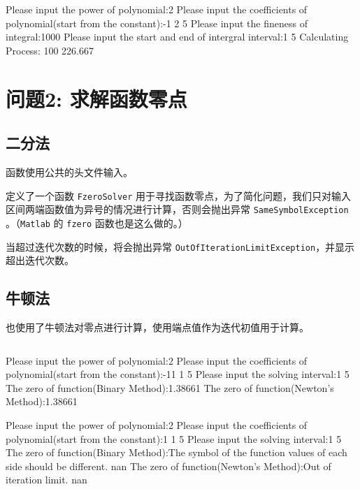\documentclass[12pt,a4paper]{article}
\begin{document}


\begin{literal}
Please input the power of polynomial:2
Please input the coefficients of polynomial(start from the constant):-1 2 5
Please input the fineness of integral:1000
Please input the start and end of intergral interval:1 5
Calculating Process: 100%
226.667
\end{literal}

\section{问题2: 求解函数零点}

\subsection{二分法}

函数使用公共的头文件输入。

定义了一个函数 \texttt{FzeroSolver} 用于寻找函数零点，为了简化问题，我们只对输入区间两端函数值为异号的情况进行计算，否则会抛出异常 \texttt{SameSymbolException} 。（\texttt{Matlab} 的 \texttt{fzero} 函数也是这么做的。）

当超过迭代次数的时候，将会抛出异常 \texttt{OutOfIterationLimitException}，并显示超出迭代次数。

\subsection{牛顿法}

也使用了牛顿法对零点进行计算，使用端点值作为迭代初值用于计算。

% 
\inputminted[]{cpp}{code/fzero.cpp}

\begin{literal}
Please input the power of polynomial:2
Please input the coefficients of polynomial(start from the constant):-11 1 5
Please input the solving interval:1 5
The zero of function(Binary Method):1.38661
The zero of function(Newton's Method):1.38661
\end{literal}

\begin{literal}
Please input the power of polynomial:2
Please input the coefficients of polynomial(start from the constant):1 1 5
Please input the solving interval:1 5
The zero of function(Binary Method):The symbol of the function values of each side should be different.
nan
The zero of function(Newton's Method):Out of iteration limit.
nan
\end{literal}
\end{document}
